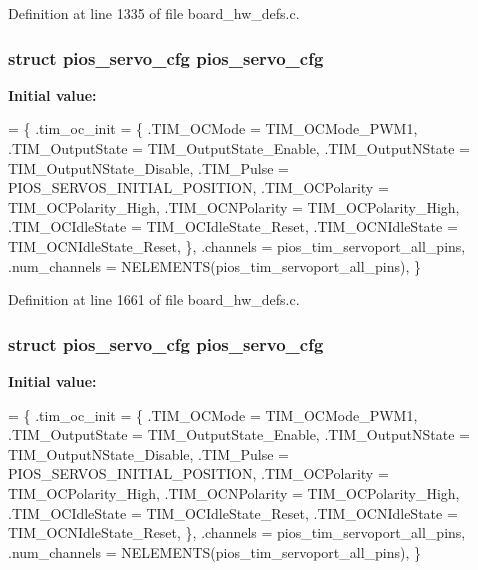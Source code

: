 Definition at line 1335 of file board\-\_\-hw\-\_\-defs.\-c.

\hypertarget{group___tau_labs_core_ga57a87ef16d7949a9cc3589efc8d88a28}{
\subsubsection[{pios\-\_\-servo\-\_\-cfg}]{\setlength{\rightskip}{0pt plus 5cm}struct {\bf pios\-\_\-servo\-\_\-cfg} {\bf pios\-\_\-servo\-\_\-cfg}}}\label{group___tau_labs_core_ga57a87ef16d7949a9cc3589efc8d88a28}
{\bfseries Initial value\-:}
\begin{DoxyCode}
= \{
        .tim\_oc\_init = \{
                .TIM\_OCMode = TIM\_OCMode\_PWM1,
                .TIM\_OutputState = TIM\_OutputState\_Enable,
                .TIM\_OutputNState = TIM\_OutputNState\_Disable,
                .TIM\_Pulse = PIOS\_SERVOS\_INITIAL\_POSITION,
                .TIM\_OCPolarity = TIM\_OCPolarity\_High,
                .TIM\_OCNPolarity = TIM\_OCPolarity\_High,
                .TIM\_OCIdleState = TIM\_OCIdleState\_Reset,
                .TIM\_OCNIdleState = TIM\_OCNIdleState\_Reset,
        \},
        .channels = pios\_tim\_servoport\_all\_pins,
        .num\_channels = NELEMENTS(pios\_tim\_servoport\_all\_pins),
\}
\end{DoxyCode}


Definition at line 1661 of file board\-\_\-hw\-\_\-defs.\-c.

\hypertarget{group___tau_labs_core_ga57a87ef16d7949a9cc3589efc8d88a28}{
\subsubsection[{pios\-\_\-servo\-\_\-cfg}]{\setlength{\rightskip}{0pt plus 5cm}struct {\bf pios\-\_\-servo\-\_\-cfg} {\bf pios\-\_\-servo\-\_\-cfg}}}\label{group___tau_labs_core_ga57a87ef16d7949a9cc3589efc8d88a28}
{\bfseries Initial value\-:}
\begin{DoxyCode}
= \{
        .tim\_oc\_init = \{
                .TIM\_OCMode = TIM\_OCMode\_PWM1,
                .TIM\_OutputState = TIM\_OutputState\_Enable,
                .TIM\_OutputNState = TIM\_OutputNState\_Disable,
                .TIM\_Pulse = PIOS\_SERVOS\_INITIAL\_POSITION,
                .TIM\_OCPolarity = TIM\_OCPolarity\_High,
                .TIM\_OCNPolarity = TIM\_OCPolarity\_High,
                .TIM\_OCIdleState = TIM\_OCIdleState\_Reset,
                .TIM\_OCNIdleState = TIM\_OCNIdleState\_Reset,
        \},
        .channels = pios\_tim\_servoport\_all\_pins,
        .num\_channels = NELEMENTS(pios\_tim\_servoport\_all\_pins),
\}
\end{DoxyCode}


